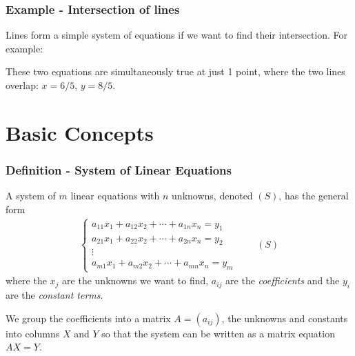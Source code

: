 \documentclass[usenames,dvipsnames,aspectratio=169,10pt]{beamer}
\numberwithin{equation}{section}
\begin{document}
\begin{frame}
\frametitle{Example - Intersection of lines}

Lines form a simple system of equations if we want to find their intersection. For example:

\begin{figure}[H]
\end{figure}

These two equations are simultaneously true at just 1 point, where the two lines overlap: $x=6/5$, $y=8/5$.

\end{frame}
\section{Basic Concepts}


\begin{frame}
\frametitle{Definition - System of Linear Equations}

A system of $m$ linear equations with $n$ unknowns, denoted $(S)$, has the general form
\begin{align*}
\begin{cases}
a_{11} x_1  + a_{12} x_2 + \cdots + a_{1n} x_n = y_1 \\
a_{21} x_1  + a_{22} x_2 + \cdots + a_{2n} x_n = y_2 \\
\vdots \\
a_{m1} x_1  + a_{m2} x_2 + \cdots + a_{mn} x_n = y_m
\end{cases}
\qquad (S)
\end{align*}
where the $x_j$ are the unknowns we want to find, $a_{ij}$ are the \textit{coefficients} and  the $y_i$ are the \textit{constant terms}.

We group the coefficients into a matrix $A=(a_{ij})$, the unknowns and constants into columns $X$ and $Y$ so that the system can be written as a matrix equation $AX=Y$. 
\end{frame}
\end{document}

